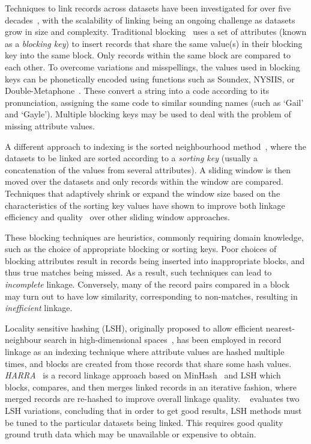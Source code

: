 \documentclass{llncs}
\begin{document}
Techniques to link records across datasets have been investigated for
over five decades~\cite{Fel69,New59}, with the scalability of linking
being an ongoing challenge as datasets grow in size and complexity.
Traditional blocking~\cite{Chr12b} uses a set of attributes (known as a
\emph{blocking key}) to insert records that share the same value(s) in
their blocking key into the same block. Only records within the same
block are  compared to each other. To overcome variations and
misspellings, the values used in blocking keys can be phonetically
encoded using functions such as Soundex, NYSIIS, or
Double-Metaphone~\cite{Chr12}. These convert a string into a code
according to its pronunciation, assigning the same code to similar
sounding names (such as `Gail' and `Gayle'). Multiple blocking keys may
be used to deal with the problem of missing attribute values.

A different approach to indexing is the sorted neighbourhood
method~\cite{Mon96}, where the datasets to be linked are sorted
according to a \emph{sorting key} (usually a concatenation of the values
from several attributes). A sliding window is then moved over the
datasets and only records within the window are compared. Techniques
that adaptively shrink or expand the window size based on the
characteristics of the sorting key values have shown to improve both
linkage efficiency and quality~\cite{Dra12} over other sliding window
approaches.

These blocking techniques are heuristics, commonly requiring domain
knowledge, such as the choice of appropriate blocking or sorting keys.
Poor choices of blocking attributes result in records being inserted
into inappropriate blocks, and thus true matches being missed. As a
result, such techniques can lead to \emph{incomplete} linkage.
Conversely, many of the record pairs compared in a block may turn
out to have low similarity, corresponding to non-matches, resulting in
\emph{inefficient} linkage.

Locality sensitive hashing (LSH), originally proposed to allow efficient
nearest-neighbour search in high-dimensional spaces~\cite{Ind98}, has
been employed in record linkage as an indexing technique where attribute
values are hashed multiple times, and blocks are created from those
records that share some hash values. \emph{HARRA}~\cite{Kim10} is a
record linkage approach based on MinHash~\cite{Broder1997} and LSH which
blocks, compares, and then merges linked records in an iterative
fashion, where merged records are re-hashed to improve overall linkage
quality. ~\cite{Steorts2014} evaluates two LSH variations, concluding
that in order to get good results, LSH methods must be tuned to the
particular datasets being linked. This requires good quality ground
truth data which may be unavailable or expensive to obtain.
\end{document}
